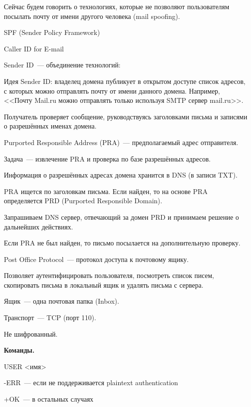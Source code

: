 
Сейчас будем говорить о технологиях, которые не позволяют пользователям посылать почту от имени другого человека (mail spoofing).

\begin{MyItemize}
    \item SPF (Sender Policy Framework) 
    \item Caller ID for E-mail 
    \item Sender ID~--- объединение технологий:
\end{MyItemize}

Идея Sender ID: владелец домена публикует в открытом доступе список адресов, с которых можно отправлять почту от имени данного домена. Например, <<Почту Mail.ru можно отправлять только используя SMTP сервер mail.ru>>.

Получатель проверяет сообщение, руководствуясь заголовками письма и записями о разрешённых именах домена.

Purported Responsible Address (PRA)~--- предполагаемый адрес отправителя.

Задача~--- извлечение PRA и проверка по базе разрешённых адресов.

Информация о разрешённых адресах домена хранится в DNS (в записи TXT).

PRA ищется по заголовкам письма. Если найден, то на основе PRA определяется PRD (Purported Responsible Domain).

Запрашиваем DNS сервер, отвечающий за домен PRD и принимаем решение о дальнейших действиях.

Если PRA не был найден, то письмо посылается на дополнительную проверку.


Post Office Protocol~--- протокол доступа к почтовому ящику.

Позволяет аутентифицировать пользователя, посмотреть список писем, скопировать письма в локальный ящик и удалять письма с сервера.

Ящик~--- одна почтовая папка (Inbox).

Транспорт~--- TCP (порт 110).

Не шифрованный.

{\bf Команды.}

USER <имя>
\begin{MyItemize}
    \item -ERR~--- если не поддерживается plaintext authentication
    \item +OK~--- в остальных случаях
\end{MyItemize}

